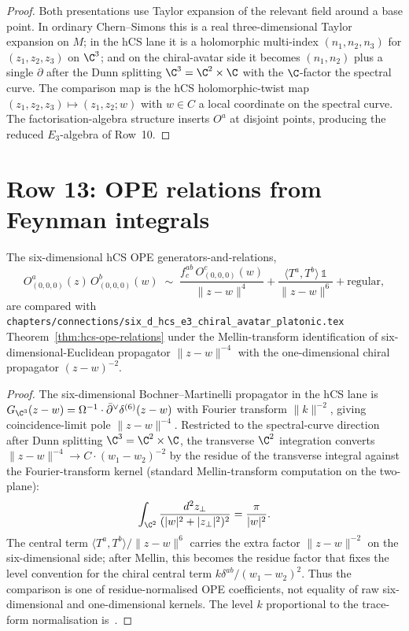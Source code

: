 \begin{proof}
Both presentations use Taylor expansion of the relevant field around a
base point. In ordinary Chern--Simons this is a real three-dimensional
Taylor expansion on $M$; in the hCS lane it is a holomorphic
multi-index $(n_1,n_2,n_3)$ for $(z_1,z_2,z_3)$ on $\C^3$; and on the
chiral-avatar side it becomes $(n_1,n_2)$ plus a single $\partial$ after
the Dunn splitting $\C^3=\C^2\times\C$ with the $\C$-factor the spectral
curve. The comparison map is the hCS holomorphic-twist map
$(z_1,z_2,z_3)\mapsto (z_1,z_2;w)$ with $w\in C$ a local coordinate on
the spectral curve. The factorisation-algebra structure inserts $O^a$
at disjoint points, producing the reduced $E_3$-algebra of Row~10.
\end{proof}

\section{Row 13: OPE relations from Feynman integrals}
\label{sec:cfg-row-13-ope}

\begin{theorem}
\label{thm:cfg-row-13}
The six-dimensional hCS OPE generators-and-relations,
\[
 O^a_{(0,0,0)}(z)\,O^b_{(0,0,0)}(w)
 \;\sim\;
 \frac{f^{ab}_c\,O^c_{(0,0,0)}(w)}{\|z-w\|^4}
 + \frac{\langle T^a,T^b\rangle\,\mathbb 1}{\|z-w\|^6}
 + \mathrm{regular},
\]
are compared with
\texttt{chapters/connections/six\_d\_hcs\_e3\_chiral\_avatar\_platonic.tex}
Theorem~\ref{thm:hcs-ope-relations} under the Mellin-transform
identification of six-dimensional-Euclidean propagator
$\|z-w\|^{-4}$ with the one-dimensional chiral propagator
$(z-w)^{-2}$.
\end{theorem}

\begin{proof}
The six-dimensional Bochner--Martinelli propagator in the hCS lane is
$G_{\C^3}(z-w) = \Omega^{-1}\cdot \dbar^\vee\delta^{(6)}(z-w)$ with
Fourier transform $\|k\|^{-2}$, giving coincidence-limit pole
$\|z-w\|^{-4}$. Restricted to the spectral-curve direction after
Dunn splitting $\C^3 = \C^2\times\C$, the transverse $\C^2$
integration converts
$\|z-w\|^{-4}\to C\cdot(w_1-w_2)^{-2}$ by the residue of the
transverse integral against the Fourier-transform kernel (standard
Mellin-transform computation on the two-plane):
\[
 \int_{\C^2}\frac{d^2z_{\perp}}{(|w|^2+|z_\perp|^2)^2}
 = \frac{\pi}{|w|^2}.
\]
The central term $\langle T^a,T^b\rangle/\|z-w\|^6$ carries the extra
factor $\|z-w\|^{-2}$ on the six-dimensional side; after Mellin, this
becomes the residue factor that fixes the level convention for the
chiral central term $k\delta^{ab}/(w_1-w_2)^2$. Thus the comparison is
one of residue-normalised OPE coefficients, not equality of raw
six-dimensional and one-dimensional kernels. The level $k$ proportional
to the trace-form normalisation is~\cite{CostelloYangian}.
\end{proof}

